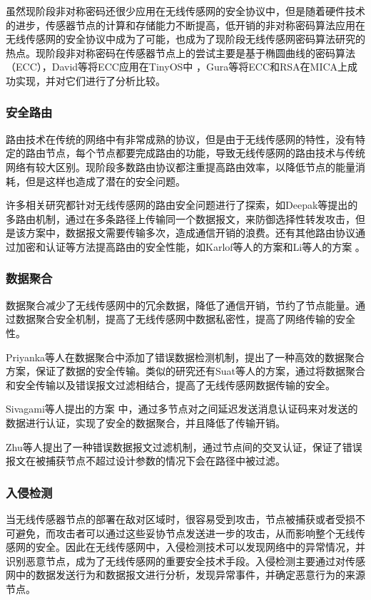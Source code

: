 虽然现阶段非对称密码还很少应用在无线传感网的安全协议中，但是随着硬件技术的进步，传感器节点的计算和存储能力不断提高，低开销的非对称密码算法应用在无线传感网的安全协议中成为了可能，也成为了现阶段无线传感网密码算法研究的热点。现阶段非对称密码在传感器节点上的尝试主要是基于椭圆曲线的密码算法（ECC），David等将ECC应用在TinyOS中
，Gura等将ECC和RSA在MICA上成功实现，并对它们进行了分析比较。
\subsubsection{安全路由}
路由技术在传统的网络中有非常成熟的协议，但是由于无线传感网的特性，没有特定的路由节点，每个节点都要完成路由的功能，导致无线传感网的路由技术与传统网络有较大区别。现阶段多数路由协议都注重提高路由效率，以降低节点的能量消耗，但是这样也造成了潜在的安全问题。

许多相关研究都针对无线传感网的路由安全问题进行了探索，如Deepak等提出的多路由机制，通过在多条路径上传输同一个数据报文，来防御选择性转发攻击，但是该方案中，数据报文需要传输多次，造成通信开销的浪费。还有其他路由协议通过加密和认证等方法提高路由的安全性能，如Karlof等人的方案和Li等人的方案
。
\subsubsection{数据聚合}
数据聚合减少了无线传感网中的冗余数据，降低了通信开销，节约了节点能量。通过数据聚合安全机制，提高了无线传感网中数据私密性，提高了网络传输的安全性。

Priyanka等人在数据聚合中添加了错误数据检测机制，提出了一种高效的数据聚合方案，保证了数据的安全传输。类似的研究还有Suat等人的方案，通过将数据聚合和安全传输以及错误报文过滤相结合，提高了无线传感网数据传输的安全。

Sivagami等人提出的方案 中，通过多节点对之间延迟发送消息认证码来对发送的数据进行认证，实现了安全的数据聚合，并且降低了传输开销。

Zhu等人提出了一种错误数据报文过滤机制，通过节点间的交叉认证，保证了错误报文在被捕获节点不超过设计参数的情况下会在路径中被过滤。

\subsubsection{入侵检测}
当无线传感器节点的部署在敌对区域时，很容易受到攻击，节点被捕获或者受损不可避免，而攻击者可以通过这些妥协节点发送进一步的攻击，从而影响整个无线传感网的安全。因此在无线传感网中，入侵检测技术可以发现网络中的异常情况，并识别恶意节点，成为了无线传感网的重要安全技术手段。入侵检测主要通过对传感网中的数据发送行为和数据报文进行分析，发现异常事件，并确定恶意行为的来源节点。

